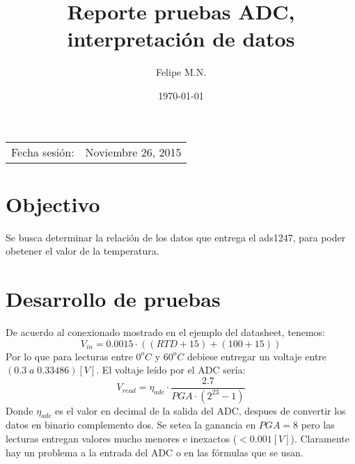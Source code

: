 \documentclass{article}
\title{Reporte pruebas ADC, interpretación de datos}
\author{Felipe M.N.} %
\date{\today} %
\begin{document}
\maketitle %

\begin{center}
\begin{tabular}{l r}
Fecha sesión: & Noviembre 26, 2015 %
\end{tabular}
\end{center}



\section{Objectivo}
Se busca determinar la relación de los datos que entrega el ads1247, para poder obetener el valor de la temperatura.
\section{Desarrollo de pruebas}
De acuerdo al conexionado mostrado en el ejemplo del datasheet, tenemos:
\[
V_{in}=0.0015\cdot((RTD+15)+(100+15))
\]
Por lo que para lecturas entre $0^oC$ y $60^oC$ debiese entregar un voltaje entre $(0.3\; a\; 0.33486)[V]$. El voltaje leído por el ADC sería:
\[
V_{read} =  \eta_{adc}\cdot\frac{2.7}{PGA\cdot (2^{23}-1)}
\]
Donde $\eta_{adc}$ es el valor en decimal de la salida del ADC, despues de convertir los datos en binario complemento dos. Se setea la ganancia en $PGA=8$ pero las lecturas entregan valores mucho menores e inexactos ($<0.001 [V]$). Claramente hay un problema a la entrada del ADC o en las fórmulas que se usan.
\end{document}
